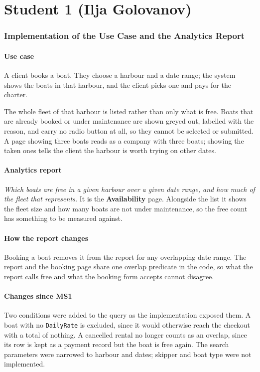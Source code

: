 \documentclass[a4paper, 11pt]{article}          %
\begin{document}
\section*{Student 1 (Ilja Golovanov)}
\subsubsection{Implementation of the Use Case and the Analytics Report}

\paragraph{Use case} A client books a boat. They choose a harbour and a date
range; the system shows the boats in that harbour, and the client picks one and
pays for the charter.

The whole fleet of that harbour is listed rather than only what is free. Boats
that are already booked or under maintenance are shown greyed out, labelled with
the reason, and carry no radio button at all, so they cannot be selected or
submitted. A page showing three boats reads as a company with three boats;
showing the taken ones tells the client the harbour is worth trying on other
dates.

\paragraph{Analytics report} \emph{Which boats are free in a given harbour over
a given date range, and how much of the fleet that represents.} It is the
\textbf{Availability} page. Alongside the list it shows the fleet size and how
many boats are not under maintenance, so the free count has something to be
measured against.

\paragraph{How the report changes} Booking a boat removes it from the report for
any overlapping date range. The report and the booking page share one overlap
predicate in the code, so what the report calls free and what the booking form
accepts cannot disagree.

\paragraph{Changes since MS1} Two conditions were added to the query as the
implementation exposed them. A boat with no \texttt{DailyRate} is excluded, since
it would otherwise reach the checkout with a total of nothing. A cancelled
rental no longer counts as an overlap, since its row is kept as a payment record
but the boat is free again. The search parameters were narrowed to harbour and
dates; skipper and boat type were not implemented.
\end{document}

